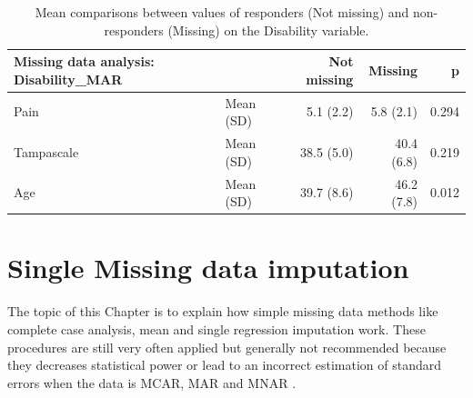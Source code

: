 \documentclass[
]{book}
\newenvironment{Shaded}{\begin{snugshade}}{\end{snugshade}}
\newcommand{\DataTypeTok}[1]{\textcolor[rgb]{0.13,0.29,0.53}{#1}}
\newcommand{\KeywordTok}[1]{\textcolor[rgb]{0.13,0.29,0.53}{\textbf{#1}}}
\newcommand{\NormalTok}[1]{#1}
\newcommand{\OperatorTok}[1]{\textcolor[rgb]{0.81,0.36,0.00}{\textbf{#1}}}
\newcommand{\OtherTok}[1]{\textcolor[rgb]{0.56,0.35,0.01}{#1}}
\newcommand{\StringTok}[1]{\textcolor[rgb]{0.31,0.60,0.02}{#1}}
\begin{document}
\begin{Shaded}
\end{Shaded}

\begin{table}

\caption{\label{tab:unnamed-chunk-53}Mean comparisons between values of responders (Not missing) and 
        non-responders (Missing) on the Disability variable.}
\centering
\begin{tabular}[t]{l|l|r|r|r}
\hline
Missing data analysis: Disability\_MAR &   & Not missing & Missing & p\\
\hline
Pain & Mean (SD) & 5.1 (2.2) & 5.8 (2.1) & 0.294\\
\hline
Tampascale & Mean (SD) & 38.5 (5.0) & 40.4 (6.8) & 0.219\\
\hline
Age & Mean (SD) & 39.7 (8.6) & 46.2 (7.8) & 0.012\\
\hline
\end{tabular}
\end{table}

\hypertarget{single-missing-data-imputation}{%
\chapter{Single Missing data imputation}\label{single-missing-data-imputation}}

The topic of this Chapter is to explain how simple missing data methods like complete case analysis, mean and single regression imputation work. These procedures are still very often applied \citep{Eekhout2012} but generally not recommended because they decreases statistical power or lead to an incorrect estimation of standard errors when the data is MCAR, MAR and MNAR \citep{Eekhout2014, VanBuuren2018, enders2010applied}.
\end{document}
